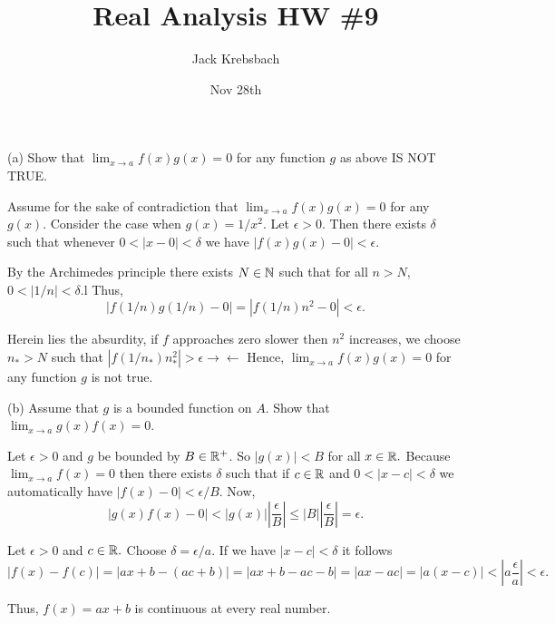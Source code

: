 \documentclass{report}
\title{Real Analysis HW \#9}
\author{Jack Krebsbach }
\date{Nov 28th}
\begin{document}
\maketitle


(a) Show that $\lim _{x \rightarrow a} f(x) g(x)=0$ for any function $g$ as above IS NOT TRUE.

\begin{myproof}
     Assume for the sake of contradiction that $\lim _{x \rightarrow a} f(x) g(x)=0$ for  any $g(x).$ Consider the case when $g(x)= 1/x^2.$ Let $\epsilon >0.$ Then there exists $\delta$ such that whenever $0 < |x - 0| < \delta$ we have $|f(x)g(x) -0|<\epsilon.$

  By the Archimedes principle there exists $N \in \NN$ such that for all $n > N,$ $0 < |1/n| < \delta.$l Thus, $$ |f(1/n)g(1/n)-0|=|f(1/n)n^2 -0|<\epsilon.$$

  Herein lies the absurdity, if $f$ approaches zero slower then $n^2$ increases, we  choose $n_* > N$ such that $ |f(1/n_*)n_*^2| > \epsilon \rightarrow\!\leftarrow$
Hence, $\lim _{x \rightarrow a} f(x) g(x)=0$ for any function $g$ is not true.
\end{myproof}

\bigskip
\bigskip
\bigskip

(b) Assume that $g$ is a bounded function on $A$. Show that $\lim _{x \rightarrow a} g(x) f(x)=0$.

\begin{myproof}
    Let $\epsilon >0$ and $g$ be bounded by $B \in \RR^+$. So $|g(x)| < B$ for all $x \in \RR.$ Because $\lim _{x \rightarrow a} f(x)=0$ then there exists $\delta$ such that if $c\in \RR$ and $0 < | x -c | <\delta$ we automatically have $|f(x) - 0| <  \epsilon / B$.
Now, $$ |g(x)f(x) - 0| < |g(x)|\left|\frac{\epsilon}{B}\right| \leq |B|\left|\frac{\epsilon}{B}\right| = \epsilon.  $$

\end{myproof}

\pagebreak
{}


\begin{myproof}
    Let $\epsilon >0$ and $c \in \RR.$ Choose $\delta = \epsilon/a.$ If we have $ |x-c|< \delta$ it follows $$ |f(x) - f(c)| = |ax +b - (ac+b)| = | ax + b -ac - b | = |ax -ac| = |a(x-c)| < |a \frac{\epsilon}{a} | < \epsilon.$$

Thus, $f(x)=a x+b$ is continuous at every real number.
\end{myproof}
\end{document}
